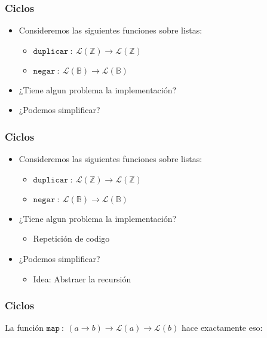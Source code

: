 \documentclass{beamer}
\begin{document}
\begin{frame}
\frametitle{Ciclos}
\begin{itemize}
    \item{Consideremos las siguientes funciones sobre listas:
    \begin{itemize}
        \item{$\mathtt{duplicar}\ :\ \mathcal{L}(\mathbb{Z})\rightarrow \mathcal{L}(\mathbb{Z})$}
        \item{$\mathtt{negar}\ :\ \mathcal{L}(\mathbb{B})\rightarrow \mathcal{L}(\mathbb{B})$}
    \end{itemize}
    }
    \item{¿Tiene algun problema la implementaci\'on?}
    \item{¿Podemos simplificar?}
\end{itemize}
\end{frame}

\begin{frame}
    \frametitle{Ciclos}
    \begin{itemize}
        \item{Consideremos las siguientes funciones sobre listas:
        \begin{itemize}
            \item{$\mathtt{duplicar}\ :\ \mathcal{L}(\mathbb{Z})\rightarrow \mathcal{L}(\mathbb{Z})$}
            \item{$\mathtt{negar}\ :\ \mathcal{L}(\mathbb{B})\rightarrow \mathcal{L}(\mathbb{B})$}
        \end{itemize}
        }
        \item{¿Tiene algun problema la implementaci\'on?
            \begin{itemize}
                \item{Repetici\'on de codigo}
            \end{itemize}
        }
        \item{¿Podemos simplificar?
            \begin{itemize}
                \item{Idea: Abstraer la recursi\'on}
            \end{itemize}
        }
    \end{itemize}
\end{frame}

\begin{frame}
    \frametitle{Ciclos}
    La funci\'on $\mathtt{map}\ :\ (a\rightarrow b) \rightarrow
    \mathcal{L}(a) \rightarrow \mathcal{L}(b)$ hace exactamente eso:
\end{frame}
\end{document}
